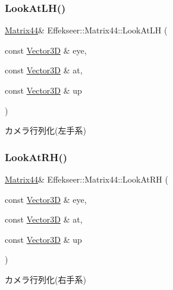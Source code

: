 \subsubsection{\texorpdfstring{Look\+At\+L\+H()}{LookAtLH()}}
{\footnotesize\ttfamily \mbox{\hyperlink{struct_effekseer_1_1_matrix44}{Matrix44}}\& Effekseer\+::\+Matrix44\+::\+Look\+At\+LH (\begin{DoxyParamCaption}\item[{const \mbox{\hyperlink{struct_effekseer_1_1_vector3_d}{Vector3D}} \&}]{eye,  }\item[{const \mbox{\hyperlink{struct_effekseer_1_1_vector3_d}{Vector3D}} \&}]{at,  }\item[{const \mbox{\hyperlink{struct_effekseer_1_1_vector3_d}{Vector3D}} \&}]{up }\end{DoxyParamCaption})}



カメラ行列化(左手系) 

\mbox{\label{struct_effekseer_1_1_matrix44_aa27b9ef241d27851b1a28da82b529cb5}} 
\subsubsection{\texorpdfstring{Look\+At\+R\+H()}{LookAtRH()}}
{\footnotesize\ttfamily \mbox{\hyperlink{struct_effekseer_1_1_matrix44}{Matrix44}}\& Effekseer\+::\+Matrix44\+::\+Look\+At\+RH (\begin{DoxyParamCaption}\item[{const \mbox{\hyperlink{struct_effekseer_1_1_vector3_d}{Vector3D}} \&}]{eye,  }\item[{const \mbox{\hyperlink{struct_effekseer_1_1_vector3_d}{Vector3D}} \&}]{at,  }\item[{const \mbox{\hyperlink{struct_effekseer_1_1_vector3_d}{Vector3D}} \&}]{up }\end{DoxyParamCaption})}



カメラ行列化(右手系) 

\mbox{\label{struct_effekseer_1_1_matrix44_ab0200013341b97e62273a5085ee67448}} 
